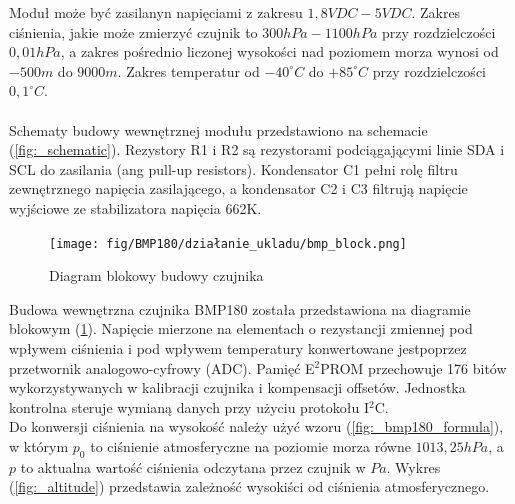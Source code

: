 \documentclass[11pt, a4paper]{article}
\begin{document}
Moduł może być zasilanyn napięciami z zakresu $1,8V DC - 5V DC$. Zakres ciśnienia, jakie może zmierzyć czujnik to $300hPa - 1100hPa$ przy rozdzielczości $0,01hPa$, a zakres pośrednio liczonej wysokości nad poziomem morza wynosi od $-500m$ do $9000m$. Zakres temperatur od $-40^\circ C $ do $+85^\circ C $ przy rozdzielczości $0,1^\circ C $.
\\  \\
Schematy budowy wewnętrznej modułu przedstawiono na schemacie (\ref{fig:_schematic}). Rezystory R1 i R2 są rezystorami podciągającymi linie SDA i SCL do zasilania (ang pull-up resistors). Kondensator C1 pełni rolę filtru zewnętrznego napięcia zasilającego, a kondensator C2 i C3 filtrują napięcie wyjściowe ze stabilizatora napięcia 662K.

\vspace{0.25cm}
\begin{figure}[h]
    \centering
    \texttt{[image: fig/BMP180/działanie\_ukladu/bmp\_block.png]}
    \caption{Diagram blokowy budowy czujnika \cite{Bosch:BMP180}}
    \label{fig:_schemat_blok}
\end{figure}
\vspace{0.25cm}

Budowa wewnętrzna czujnika BMP180 została przedstawiona na diagramie blokowym (\ref{fig:_schemat_blok}). Napięcie mierzone na elementach o rezystancji zmiennej pod wpływem ciśnienia i pod wpływem temperatury konwertowane jestpoprzez przetwornik analogowo-cyfrowy (ADC). Pamięć E$^2$PROM przechowuje 176 bitów wykorzystywanych w kalibracji czujnika i kompensacji offsetów. Jednostka kontrolna steruje wymianą danych przy użyciu protokołu I$^2$C.
\\ 
Do konwersji ciśnienia na wysokość należy użyć wzoru (\ref{fig:_bmp180_formula}), w którym $p_0$ to ciśnienie atmosferyczne na poziomie morza równe $1013,25hPa$, a $p$ to aktualna wartość ciśnienia odczytana przez czujnik w $Pa$. Wykres (\ref{fig:_altitude}) przedstawia zależność wysokiści od ciśnienia atmosferycznego.
\end{document}
